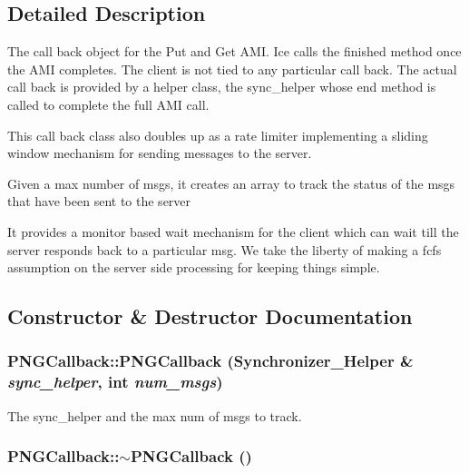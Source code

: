 \subsection{Detailed Description}
The call back object for the Put and Get AMI. Ice calls the finished method once the AMI completes. The client is not tied to any particular call back. The actual call back is provided by a helper class, the sync\_\-helper whose end method is called to complete the full AMI call.

This call back class also doubles up as a rate limiter implementing a sliding window mechanism for sending messages to the server.

Given a max number of msgs, it creates an array to track the status of the msgs that have been sent to the server

It provides a monitor based wait mechanism for the client which can wait till the server responds back to a particular msg. We take the liberty of making a fcfs assumption on the server side processing for keeping things simple. 

\subsection{Constructor \& Destructor Documentation}
\hypertarget{class_p_n_g_callback_a5171eeb1412a198a7645858067ee0e32}{
\subsubsection[{PNGCallback}]{\setlength{\rightskip}{0pt plus 5cm}PNGCallback::PNGCallback ({\bf Synchronizer\_\-Helper} \& {\em sync\_\-helper}, \/  int {\em num\_\-msgs})}}
\label{class_p_n_g_callback_a5171eeb1412a198a7645858067ee0e32}


The sync\_\-helper and the max num of msgs to track. 

\hypertarget{class_p_n_g_callback_ac3e33d408123c2cfafef78a38652fdaa}{
\subsubsection[{$\sim$PNGCallback}]{\setlength{\rightskip}{0pt plus 5cm}PNGCallback::$\sim$PNGCallback ()}}
\label{class_p_n_g_callback_ac3e33d408123c2cfafef78a38652fdaa}


